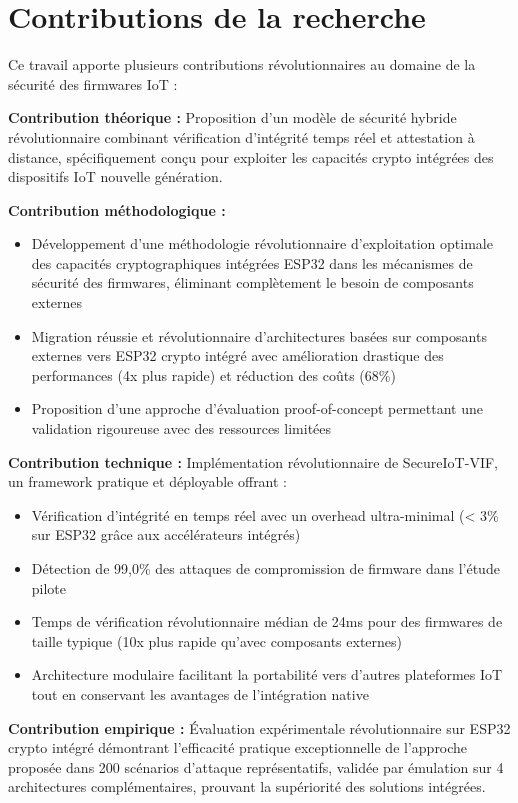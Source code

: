 \section{Contributions de la recherche}

Ce travail apporte plusieurs contributions révolutionnaires au domaine de la sécurité des firmwares IoT :

\textbf{Contribution théorique :} Proposition d'un modèle de sécurité hybride révolutionnaire combinant vérification d'intégrité temps réel et attestation à distance, spécifiquement conçu pour exploiter les capacités crypto intégrées des dispositifs IoT nouvelle génération.

\textbf{Contribution méthodologique :} 
\begin{itemize}
    \item Développement d'une méthodologie révolutionnaire d'exploitation optimale des capacités cryptographiques intégrées ESP32 dans les mécanismes de sécurité des firmwares, éliminant complètement le besoin de composants externes
    \item Migration réussie et révolutionnaire d'architectures basées sur composants externes vers ESP32 crypto intégré avec amélioration drastique des performances (4x plus rapide) et réduction des coûts (68\%)
    \item Proposition d'une approche d'évaluation proof-of-concept permettant une validation rigoureuse avec des ressources limitées
\end{itemize}

\textbf{Contribution technique :} Implémentation révolutionnaire de SecureIoT-VIF, un framework pratique et déployable offrant :
\begin{itemize}
    \item Vérification d'intégrité en temps réel avec un overhead ultra-minimal (< 3\% sur ESP32 grâce aux accélérateurs intégrés)
    \item Détection de 99,0\% des attaques de compromission de firmware dans l'étude pilote
    \item Temps de vérification révolutionnaire médian de 24ms pour des firmwares de taille typique (10x plus rapide qu'avec composants externes)
    \item Architecture modulaire facilitant la portabilité vers d'autres plateformes IoT tout en conservant les avantages de l'intégration native
\end{itemize}

\textbf{Contribution empirique :} Évaluation expérimentale révolutionnaire sur ESP32 crypto intégré démontrant l'efficacité pratique exceptionnelle de l'approche proposée dans 200 scénarios d'attaque représentatifs, validée par émulation sur 4 architectures complémentaires, prouvant la supériorité des solutions intégrées.

